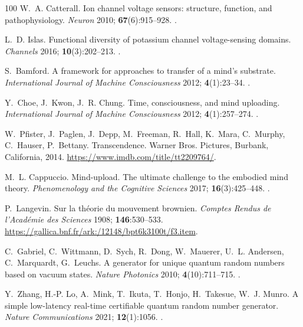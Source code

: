 \documentclass{ws-ijmpb}
\begin{document}
\begin{thebibliography}{100}
W.~A. Catterall. Ion channel voltage sensors: structure, function, and
  pathophysiology. \emph{Neuron} 2010; \textbf{67}(6):915--928.
\newblock \href {http://doi.org/10.1016/j.neuron.2010.08.021}
  {}.

L.~D. Islas. Functional diversity of potassium channel voltage-sensing domains.
  \emph{Channels} 2016; \textbf{10}(3):202--213.
\newblock \href {http://doi.org/10.1080/19336950.2016.1141842}
  {}.

S.~Bamford. A framework for approaches to transfer of a mind's substrate.
  \emph{International Journal of Machine Consciousness} 2012;
  \textbf{4}(1):23--34.
\newblock \href {http://doi.org/10.1142/s1793843012400021}
  {}.

Y.~Choe, J.~Kwon, J.~R. Chung. Time, consciousness, and mind uploading.
  \emph{International Journal of Machine Consciousness} 2012;
  \textbf{4}(1):257--274.
\newblock \href {http://doi.org/10.1142/S179384301240015X}
  {}.

W.~Pfister, J.~Paglen, J.~Depp, M.~Freeman, R.~Hall, K.~Mara, C.~Murphy,
  C.~Hauser, P.~Bettany. Transcendence. Warner Bros. Pictures, Burbank,
  California, 2014.
\newblock \url{https://www.imdb.com/title/tt2209764/}.

M.~L. Cappuccio. Mind-upload. {T}he ultimate challenge to the embodied mind
  theory. \emph{Phenomenology and the Cognitive Sciences} 2017;
  \textbf{16}(3):425--448.
\newblock \href {http://doi.org/10.1007/s11097-016-9464-0}
  {}.

P.~Langevin. Sur la th\'{e}orie du mouvement brownien. \emph{Comptes Rendus de
  l'Acad\'{e}mie des Sciences} 1908; \textbf{146}:530--533.
\newblock \url{https://gallica.bnf.fr/ark:/12148/bpt6k3100t/f3.item}.

C.~Gabriel, C.~Wittmann, D.~Sych, R.~Dong, W.~Mauerer, U.~L. Andersen,
  C.~Marquardt, G.~Leuchs. A generator for unique quantum random numbers based
  on vacuum states. \emph{Nature Photonics} 2010; \textbf{4}(10):711--715.
\newblock \href {http://doi.org/10.1038/nphoton.2010.197}
  {}.

Y.~Zhang, H.-P. Lo, A.~Mink, T.~Ikuta, T.~Honjo, H.~Takesue, W.~J. Munro. A
  simple low-latency real-time certifiable quantum random number generator.
  \emph{Nature Communications} 2021; \textbf{12}(1):1056.
\newblock \href {http://doi.org/10.1038/s41467-021-21069-8}
  {}.


\end{thebibliography}
\end{document}

